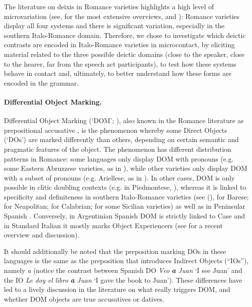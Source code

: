 \documentclass[output=paper,hidelinks]{langscibook}
\begin{document}
The literature on deixis in Romance varieties highlights a high level of microvariation (see, for the most extensive overviews, \citealt{Ledgeway2015} and \citealt{LedgewaySmith2016}): Romance varieties display all four systems and there is significant variation, especially in the southern Italo-Romance domain. Therefore, we chose to investigate which deictic contrasts are encoded in Italo-Romance varieties in microcontact, by eliciting material related to the three possible deictic domains (close to the speaker, close to the hearer, far from the speech act participants), to test how these systems behave in contact and, ultimately, to better understand how these forms are encoded in the grammar.


\paragraph{Differential Object Marking.} %

Differential Object Marking (`DOM'; \citealt{Moravcsik1978, Bossong1985, Bossong1991}), also known in the Romance literature as prepositional accusative \citep{Diez1874, Meyer-Lubke1890, Meyer-Lubke1895}, is the phenomenon whereby some Direct Objects (`DOs') are marked differently than others, depending on certain semantic and pragmatic features of the object. The phenomenon has different distribution patterns in Romance: some languages only display DOM with pronouns (e.g. some Eastern Abruzzese varieties, as in \citealt{ManziniSavoia2005}), while other varieties only display DOM with a subset of pronouns (e.g. Ariellese, as in \citealt{DAlessandro2017}). In other cases, DOM is only possible in clitic doubling contexts (e.g. in Piedmontese, \citealt{ManziniSavoia2005}), whereas it is linked to specificity and definiteness in southern Italo-Romance varieties (see \citeauthor{AndrianiTA} (\citeyear{AndrianiTA}), for Barese; \citealt{Ledgeway2009} for Neapolitan; \citealt{LedgewaySchifanoSilvestri2019} for Calabrian; \citealt{Guardiano2000, Guardiano2010} for some Sicilian varieties) as well as in Peninsular Spanish \citep{Leonetti2004}. Conversely, in Argentinian Spanish DOM is strictly linked to Case \citep{Saab2018} and in Standard Italian it mostly marks Object Experiencers (see \citealt{Belletti2018} for a recent overview and discussion). 

It should additionally be noted that the preposition marking DOs in these languages is the same as the preposition that introduces Indirect Objects (``IOs''), namely \textit{a} (notice the contrast between Spanish DO \textit{Veo \textbf{a} Juan} `I see Juan' and the IO \textit{Le doy el libro \textbf{a} Juan} `I gave the book to Juan'). These differences have led to a lively discussion in the literature on what really triggers DOM, and whether DOM objects are true accusatives or datives.
\end{document}
